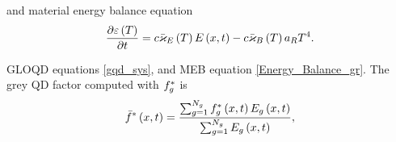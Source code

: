 	and material energy balance equation
	\begin{equation}
		\frac{\partial \varepsilon\left( T\right)}{\partial t} = c\bar{\varkappa}_{E}\left( T\right)E\left( x,t\right) - c\bar{\varkappa}_{B}\left( T\right)a_R T^4. \label{mlqd_pod_eb}
	\end{equation}
	\fi
	
	GLOQD equations \eqref{gqd_sys}, and MEB equation \eqref{Energy_Balance_gr}. The grey QD factor computed with $f_g^*$ is
	\begin{equation}
		\bar{f}^*\left( x,t\right) = \frac{\sum_{g=1}^{N_g} f_g^*\left( x,t\right)E_g\left( x,t\right)}{\sum_{g=1}^{N_g} E_g\left( x,t\right)},
	\end{equation}
	
	\iffalse
	the grey opacities are
	\begin{subequations}
		\begin{gather}
			\kapeb\pr{T} = \frac{ \sum_{g=1}^{N_g}\kapg\pr{T}\eg\pr{x,t} }{ \sum_{g=1}^{N_g}\eg\pr{x,t} } \\[5pt]
			\kapbb\pr{T} = \frac{ \sum_{g=1}^{N_g}\kapg\pr{T}\Bg\pr{T} }{ \sum_{g=1}^{N_g}\Bg\pr{T} } \\[5pt]
			\kaprb\pr{T} = \frac{ \sum_{g=1}^{N_g}\kapg\pr{T}\abs{\bFg\pr{x,t}} }{ \sum_{g=1}^{N_g}\abs{\bFg\pr{x,t}} },
		\end{gather}
		\label{mlqd_pod_grey_opacities}
	\end{subequations}

	and the compensation term is
	\begin{equation}
		\eta\pr{x,t} = \frac{ \sum_{g=1}^{N_g}\brk{\pr{\kapg\pr{T} - \kaprb\pr{T}}\bFg\pr{x,t}} }{ \sum_{g=1}^{N_g}\eg\pr{x,t} }.
	\end{equation}
	\fi
	
	
	\iffalse
	\begin{subequations}
			\begin{gather}
				\Fgirn - \Fgiln + c\delxi\modkapgin\pr{T}\egin = \delxi\pr{4\pi\kapgin\pr{T}\Bgin\pr{T} + \frac{\eginl}{\deltn}}\\
				c\pr{\fgirrn^*\egirrn - \fgin^*\egin} + \delxir\modkapgirn\pr{T}\Fgirn = \delxir\frac{\Fgirnl}{c\deltn}\\
				\Fbirn - \Fbiln + c\delxi\kapebin^*\pr{T}\ebin = c\kapbbin\pr{T}\ar T^4_{i,n} + \frac{\ebinl}{\deltn}
			\end{gather}
			\vspace*{-1.2cm}
			\begin{multline}
				c\pr{\fbirrn^*\ebirrn - \fbin^*\ebin} + \delxir\modkaprbirn\pr{T}\Fbirn \\+ \pr{\etairnp\ebirrn - \etairnm\ebin} = \delxir\frac{\Fbirnl}{c\deltn}
			\end{multline}
			\vspace*{-.9cm}
			\begin{gather}
				\frac{\varepsilon_{i,n}\pr{T} - \varepsilon_{i,n-1}\pr{T}}{\delt_n} = c\kapebin\ebin - c\ar\kapbbin\tin^4\\
				i = 1,\dots,I, \ g = 1,\dots,N_g, \ n = 1,\dots,N_n \nn
			\end{gather}
	\end{subequations}
	\fi

